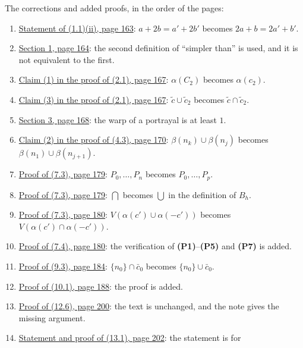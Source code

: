 The corrections and added proofs, in the order of the pages:
\begin{enumerate}\setlength{\itemsep}{1pt}
\item {}\hyperref[fix:1.1]{Statement of (1.1)(ii), page 163}: $a + 2b = a' + 2b'$ becomes
$2a + b = 2a' + b'$.
\item {}\hyperref[fix:1-simpler]{Section 1, page 164}: the second definition of ``simpler than''
is used, and it is not equivalent to the first.
\item {}\hyperref[fix:2.1-claim1]{Claim (1) in the proof of (2.1), page 167}: $\alpha(C_2)$
becomes $\alpha(c_2)$.
\item {}\hyperref[fix:2.1-claim3]{Claim (3) in the proof of (2.1), page 167}:
$\tilde{c} \cup \tilde{c}_2$ becomes $\tilde{c} \cap \tilde{c}_2$.
\item {}\hyperref[fix:3-warp]{Section 3, page 168}: the warp of a portrayal is at least $1$.
\item {}\hyperref[fix:4.3-claim2]{Claim (2) in the proof of (4.3), page 170}:
$\beta(n_k) \cup \beta(n_j)$ becomes $\beta(n_1) \cup \beta(n_{j+1})$.
\item {}\hyperref[fix:7.3-paths]{Proof of (7.3), page 179}: $P_0, \dots, P_n$ becomes
$P_0, \dots, P_p$.
\item {}\hyperref[fix:7.3-Bh]{Proof of (7.3), page 179}: $\bigcap$ becomes $\bigcup$ in the
definition of $B_h$.
\item {}\hyperref[fix:7.3-p180]{Proof of (7.3), page 180}: $V(\alpha(c') \cup \alpha(-c'))$
becomes $V(\alpha(c') \cap \alpha(-c'))$.
\item {}\hyperref[fix:7.4-axioms-added]{Proof of (7.4), page 180}: the verification of
\textbf{(P1)}--\textbf{(P5)} and \textbf{(P7)} is added.
\item {}\hyperref[fix:9.3-proof]{Proof of (9.3), page 184}: $\{n_0\} \cap \bar{c}_0$ becomes
$\{n_0\} \cup \bar{c}_0$.
\item {}\hyperref[fix:10.1-proof-added]{Proof of (10.1), page 188}: the proof is added.
\item {}\hyperref[fix:12.6-proof]{Proof of (12.6), page 200}: the text is unchanged, and the note
gives the missing argument.
\item {}\hyperref[fix:13.1]{Statement and proof of (13.1), page 202}: the statement is for

\end{enumerate}
